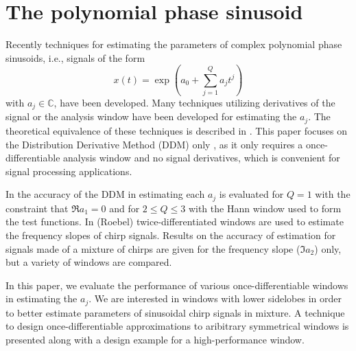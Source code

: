 \documentclass[twoside,a4paper]{article}
\begin{document}
\section{The polynomial phase sinusoid}
Recently techniques for estimating the parameters of complex polynomial phase sinusoids,
i.e., signals of the form
%
\begin{equation}
    \label{eq:polyphaseexp}
    x(t) = \exp(a_0 + \sum_{j=1}^{Q} a_j t^j)
\end{equation}
%
with $a_{j} \in \mathbb{C}$, have been developed. Many techniques
utilizing derivatives of the signal or the analysis window have
been developed for estimating the $a_j$. The theoretical equivalence of these
techniques is described in \cite{hamilton2011non}. This paper focuses on the
Distribution Derivative Method (DDM) only \cite{betser2009sinusoidal}, as it only requires a once-differentiable
analysis window and no signal derivatives, which is convenient for signal
processing applications.

In \cite{hamilton2012comparisons} the accuracy
of the DDM in estimating each $a_{j}$ is evaluated for $Q=1$ with the constraint
that $\Re{a_1}=0$ and for $2 \leq Q \leq 3$ with the Hann window used to form
the test functions. In (Roebel) twice-differentiated windows are used to
estimate the frequency slopes of chirp signals. Results on the accuracy of
estimation for signals made of a mixture of chirps are given for the frequency
slope ($\Im{a_2}$) only, but a variety of windows are compared.

In this paper, we evaluate the performance of various once-differentiable
windows in estimating the $a_{j}$. We are interested in windows with lower
sidelobes in order to better estimate parameters of sinusoidal chirp signals in
mixture. A technique to design once-differentiable approximations to aribitrary
symmetrical windows is presented along with a design example for a
high-performance window.
\end{document}
